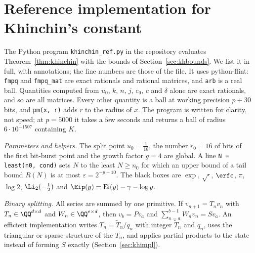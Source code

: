 
\section{Reference implementation for Khinchin's constant}\label{sec:khpseudo}

\newcommand{\reflisting}[2]{}

The Python program \texttt{khinchin\_ref.py} in the repository evaluates Theorem~\ref{thm:khinchin} with the
bounds of Section~\ref{sec:khbounds}. We list it in full, with annotations; the line numbers are those of the
file. It uses python-flint: \texttt{fmpq} and \texttt{fmpq\_mat} are exact rationals and rational matrices, and
\texttt{arb} is a real ball. Quantities computed from $u_0$, $k$, $n$, $j$, $c_0$, $c$ and $\delta$ alone are exact
rationals, and so are all matrices. Every other quantity is a ball at working precision $p + 30$ bits, and
\texttt{pm(x, r)} adds $r$ to the radius of $x$. The program is written for clarity, not speed; at $p = 5000$ it
takes a few seconds and returns a ball of radius $6\cdot10^{-1507}$ containing $K$.

\emph{Parameters and helpers.} The split point $u_0 = \frac1{16}$, the number $r_0 = 16$ of bits of the first
bit-burst point and the growth factor $g = 4$ are global. A line \texttt{N = least(n0, cond)} sets $N$ to the least
$N \ge n_0$ for which an upper bound of a tail bound $R(N)$ is at most $\varepsilon = 2^{-p-10}$. The black boxes are
$\exp$, $\sqrt{\cdot}$, $\erfc$, $\pi$, $\log 2$, $\Li_2(-\frac12)$ and $\Eip(y) = \operatorname{Ei}(y) - \gamma - \log y$.
\reflisting{12}{37}

\emph{Binary splitting.} All series are summed by one primitive. If $v_{n+1} = T_nv_n$ with
$T_n \in \QQ^{d\times d}$ and $W_n \in \QQ^{e\times d}$, then $v_b = Pv_a$ and $\sum_{n=a}^{b-1}W_nv_n = Sv_a$. An
efficient implementation writes $T_n = \tilde T_n/q_n$ with integer $\tilde T_n$ and $q_n$, uses the triangular or
sparse structure of the $T_n$, and applies partial products to the state instead of forming $S$ exactly
(Section~\ref{sec:khimpl}).
\reflisting{39}{47}

